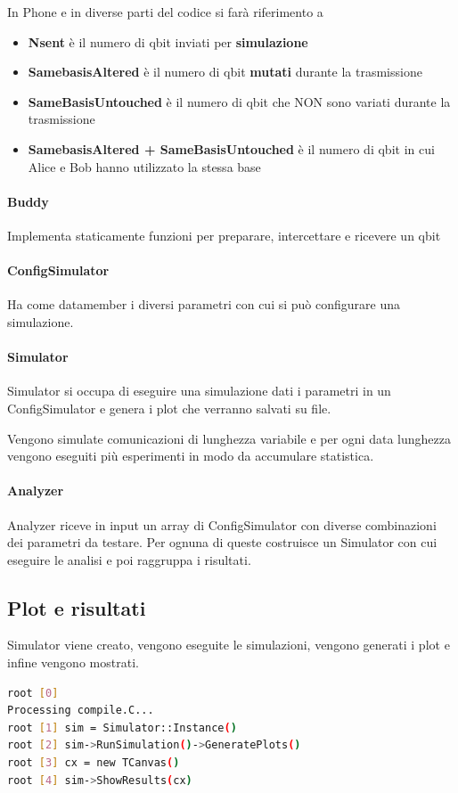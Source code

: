 \documentclass[11 pt, a4paper]{article}
\begin{document}
In Phone e in diverse parti del codice si farà riferimento a
\begin{itemize}
\item \textbf{Nsent} è il numero di qbit inviati per \textbf{simulazione}
\item \textbf{SamebasisAltered} è il numero di qbit \textbf{mutati} durante la trasmissione
\item \textbf{SameBasisUntouched} è il numero di qbit che NON sono variati durante la trasmissione
\item \textbf{SamebasisAltered + SameBasisUntouched} è il numero di qbit in cui Alice e Bob hanno utilizzato la stessa base
\end{itemize}

\paragraph{Buddy}
Implementa staticamente funzioni per preparare, intercettare e ricevere un qbit

\paragraph{ConfigSimulator}
Ha come datamember i diversi parametri con cui si può configurare una simulazione.

\paragraph{Simulator}
Simulator si occupa di eseguire una simulazione dati i parametri in un ConfigSimulator e genera i plot che verranno salvati su file.

Vengono simulate comunicazioni di lunghezza variabile e per ogni data lunghezza vengono eseguiti più esperimenti in modo da accumulare statistica.

\paragraph{Analyzer}
Analyzer riceve in input un array di ConfigSimulator con diverse combinazioni dei parametri da testare. Per ognuna di queste costruisce un Simulator con cui eseguire le analisi e poi raggruppa i risultati.

\subsection{Plot e risultati}
Simulator viene creato, vengono eseguite le simulazioni, vengono generati i plot e infine vengono mostrati.
\begin{lstlisting}[language=bash, style=myRoot]
root [0] 
Processing compile.C...
root [1] sim = Simulator::Instance()
root [2] sim->RunSimulation()->GeneratePlots()
root [3] cx = new TCanvas()
root [4] sim->ShowResults(cx)
\end{lstlisting}
\end{document}
